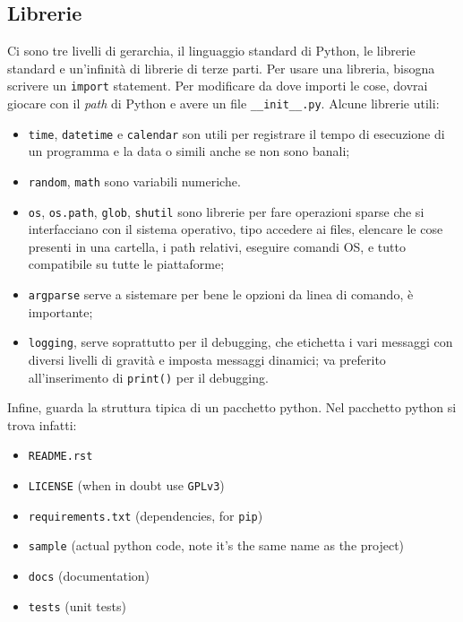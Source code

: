 \documentclass[10pt, a4paper, titlepage]{book}
\begin{document}
\subsection{Librerie}

Ci sono tre livelli di gerarchia, il linguaggio standard di Python, le librerie standard e un'infinità di librerie di terze parti.
Per usare una libreria, bisogna scrivere un \texttt{import} statement.
Per modificare da dove importi le cose, dovrai giocare con il \textit{path} di Python e avere un file \texttt{__init__.py}.
Alcune librerie utili:
\begin{itemize}
	\item \texttt{time}, \texttt{datetime} e \texttt{calendar} son utili per registrare il tempo di esecuzione di un programma e la data o simili anche se non sono banali;
	\item \texttt{random}, \texttt{math} sono variabili numeriche.
	\item \texttt{os}, \texttt{os.path}, \texttt{glob}, \texttt{shutil} sono librerie per fare operazioni sparse che si interfacciano con il sistema operativo, tipo accedere ai files, elencare le cose presenti in una cartella, i path relativi, eseguire comandi OS, e tutto compatibile su tutte le piattaforme;
	\item \texttt{argparse} serve a sistemare per bene le opzioni da linea di comando, è importante;
	\item \texttt{logging}, serve soprattutto per il debugging, che etichetta i vari messaggi con diversi livelli di gravità e imposta messaggi dinamici; va preferito all'inserimento di \texttt{print()} per il debugging.
\end{itemize}

Infine, guarda la struttura tipica di un pacchetto python. Nel pacchetto python si trova infatti:
\begin{itemize}
	\item \texttt{README.rst}

	\item \texttt{LICENSE} (when in doubt use \texttt{GPLv3})

	\item \texttt{requirements.txt} (dependencies, for \texttt{pip})

	\item \texttt{sample} (actual python code, note it’s the same name as the project)

	\item \texttt{docs} (documentation)

	\item \texttt{tests} (unit tests)
\end{itemize}
\end{document}
